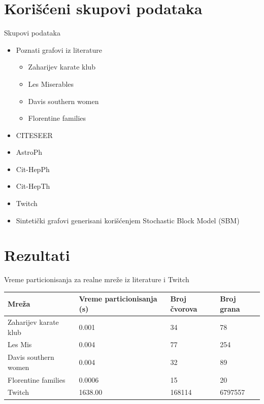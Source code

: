 \documentclass{beamer}
\begin{document}
\section{Korišćeni skupovi podataka}
\begin{frame}{Skupovi podataka}
    \begin{itemize}
        \item Poznati grafovi iz literature 
        \begin{itemize}
            \item Zaharijev karate klub
            \item Les Miserables
            \item Davis southern women
            \item Florentine families
        \end{itemize}
        \item CITESEER
        \item AstroPh
        \item Cit-HepPh
        \item Cit-HepTh
        \item Twitch 
        \item Sintetički grafovi generisani korišćenjem Stochastic Block Model (SBM)
    \end{itemize}
\end{frame}

\section{Rezultati}
\begin{frame}{Vreme particionisanja za realne mreže iz literature i Twitch}
    \centering
    \begin{table}
        \label{tab:4.2}
        \begin{tabular}{p{1.4in}p{1in}p{0.5in}p{0.5in}}
        Mreža & Vreme particionisanja (s)& Broj čvorova & Broj grana \\
        \hline
        Zaharijev karate klub & 0.001 & 34 & 78 \\
        Les Mis & 0.004 & 77 & 254 \\
        Davis southern women & 0.004 & 32 & 89 \\
        Florentine families & 0.0006 & 15 & 20 \\
        Twitch  & 1638.00 & 168114 & 6797557 \\
    \end{tabular}
\end{table}
\end{frame}
    
\end{document}
